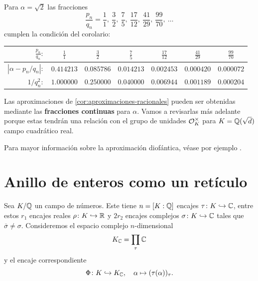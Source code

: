\begin{ejemplo}
  Para $\alpha = \sqrt{2}$ las fracciones
  $$\frac{p_n}{q_n} = \frac{1}{1}, ~ \frac{3}{2}, ~ \frac{7}{5}, ~ \frac{17}{12}, ~ \frac{41}{29}, ~ \frac{99}{70}, ~ \ldots$$
  cumplen la condición del corolario:
  \begin{center}\renewcommand{\arraystretch}{1.5}
    \begin{tabular}{rcccccc}
      \hline
      $\frac{p_n}{q_n}\colon$ & $\frac{1}{1}$ & $\frac{3}{2}$ & $\frac{7}{5}$ & $\frac{17}{12}$ & $\frac{41}{29}$ & $\frac{99}{70}$ \tabularnewline
      \hline
      $|\alpha - p_n/q_n|\colon$ & $0.414213$ & $0.085786$ & $0.014213$ & $0.002453$ & $0.000420$ & $0.000072$ \tabularnewline
      \hline
      $1/q_n^2\colon$ & $1.000000$ & $0.250000$ & $0.040000$ & $0.006944$ & $0.001189$ & $0.000204$ \tabularnewline
      \hline
      \end{tabular}
  \end{center}

\end{ejemplo}

Las aproximaciones de \ref{cor:aproximaciones-racionales} pueden ser obtenidas
mediante las \textbf{fracciones continuas} para $\alpha$. Vamos a revisarlas más
adelante porque estas tendrán una relación con el grupo de unidades
$\mathcal{O}_K^\times$ para $K = \mathbb{Q} (\sqrt{d})$ campo cuadrático real.

\vspace{1em}

Para mayor información sobre la aproximación diofántica, véase por ejemplo
\cite{Schmidt-1980}.


\section{Anillo de enteros como un retículo}

Sea $K/\mathbb{Q}$ un campo de números. Este tiene $n = [K:\mathbb{Q}]$ encajes
$\tau\colon K\hookrightarrow \mathbb{C}$, entre estos $r_1$ encajes reales
$\rho\colon K\hookrightarrow \mathbb{R}$ y $2 r_2$ encajes complejos
$\sigma\colon K\hookrightarrow \mathbb{C}$ tales que $\overline{\sigma}\ne\sigma$.
Consideremos el espacio complejo $n$-dimensional
$$K_{\mathbb{C}} = \prod_\tau \mathbb{C}$$
y el encaje correspondiente
\[ \Phi\colon K \hookrightarrow K_{\mathbb{C}}, \quad
   \alpha \mapsto (\tau (\alpha))_\tau. \]

